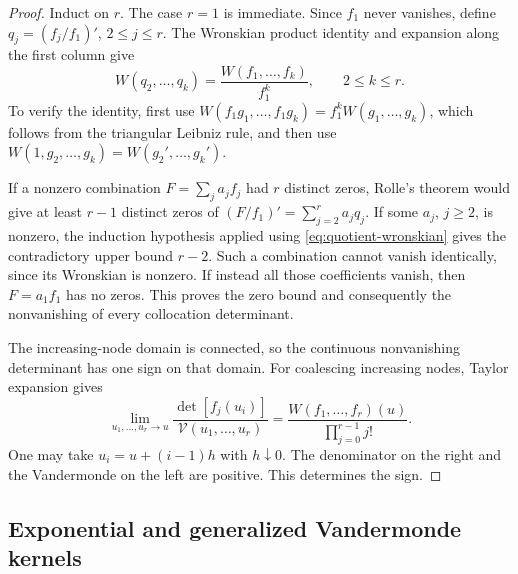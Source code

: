\documentclass[11pt,a4paper]{article}
\theoremstyle{definition}
\theoremstyle{remark}
\newcommand{\V}{\mathcal V}
\begin{document}
\begin{proof}
Induct on \(r\). The case \(r=1\) is immediate. Since \(f_1\) never
vanishes, define \(q_j=(f_j/f_1)'\), \(2\le j\le r\). The Wronskian
product identity and expansion along the first column give
\begin{equation}\label{eq:quotient-wronskian}
 W(q_2,\ldots,q_k)
 =\frac{W(f_1,\ldots,f_k)}{f_1^k},\qquad 2\le k\le r.
\end{equation}
To verify the identity, first use
\(W(f_1g_1,\ldots,f_1g_k)=f_1^k W(g_1,\ldots,g_k)\), which follows
from the triangular Leibniz rule, and then use
\(W(1,g_2,\ldots,g_k)=W(g_2',\ldots,g_k')\).

If a nonzero combination \(F=\sum_j a_jf_j\) had \(r\) distinct zeros,
Rolle's theorem would give at least \(r-1\) distinct zeros of
\((F/f_1)'=\sum_{j=2}^r a_jq_j\). If some \(a_j\), \(j\ge2\), is
nonzero, the induction hypothesis applied using
\eqref{eq:quotient-wronskian} gives the contradictory upper bound
\(r-2\). Such a combination cannot vanish identically, since its
Wronskian is nonzero. If instead all those coefficients vanish, then
\(F=a_1f_1\) has no zeros. This proves the zero bound and consequently
the nonvanishing of every collocation determinant.

The increasing-node domain is connected, so the continuous nonvanishing
determinant has one sign on that domain. For coalescing increasing nodes,
Taylor expansion gives
\begin{equation}\label{eq:coalescent}
 \lim_{u_1,\ldots,u_r\to u}
 \frac{\det[f_j(u_i)]}{\V(u_1,\ldots,u_r)}
 =\frac{W(f_1,\ldots,f_r)(u)}{\prod_{j=0}^{r-1}j!}.
\end{equation}
One may take \(u_i=u+(i-1)h\) with \(h\downarrow0\). The denominator
on the right and the Vandermonde on the left are positive. This determines
the sign.
\end{proof}

\subsection{Exponential and generalized Vandermonde kernels}
\end{document}
